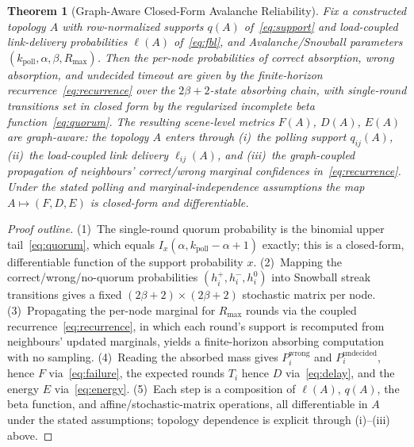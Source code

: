 \documentclass[journal]{IEEEtran}
\newtheorem{theorem}{Theorem}
\newcommand{\kpoll}{\ensuremath{k_{\mathrm{poll}}}}      %
\begin{document}
\begin{theorem}[Graph-Aware Closed-Form Avalanche Reliability]\label{thm:reliability}
Fix a constructed topology $A$ with row-normalized supports $q(A)$
of~\eqref{eq:support} and load-coupled link-delivery probabilities $\ell(A)$
of~\eqref{eq:fbl}, and Avalanche/Snowball parameters
$(\kpoll,\alpha,\beta,R_{\max})$. Then the per-node probabilities of correct
absorption, wrong absorption, and undecided timeout are given by the
finite-horizon recurrence~\eqref{eq:recurrence} over the $2\beta+2$-state
absorbing chain, with single-round transitions set in closed form by the
regularized incomplete beta function~\eqref{eq:quorum}. The resulting
scene-level metrics $F(A)$, $D(A)$, $E(A)$ are \emph{graph-aware}: the topology
$A$ enters through (i)~the polling support $q_{ij}(A)$, (ii)~the load-coupled
link delivery $\ell_{ij}(A)$, and (iii)~the graph-coupled propagation of
neighbours' correct/wrong marginal confidences in~\eqref{eq:recurrence}. Under
the stated polling and marginal-independence assumptions the map
$A\mapsto(F,D,E)$ is closed-form and differentiable.
\end{theorem}

\begin{proof}[Proof outline]
(1)~The single-round quorum probability is the binomial upper
tail~\eqref{eq:quorum}, which equals $I_x(\alpha,\kpoll-\alpha+1)$ exactly; this
is a closed-form, differentiable function of the support probability $x$.
(2)~Mapping the correct/wrong/no-quorum probabilities $(h^+_i,h^-_i,h^0_i)$ into
Snowball streak transitions gives a fixed $(2\beta+2)\times(2\beta+2)$ stochastic
matrix per node. (3)~Propagating the per-node marginal for $R_{\max}$ rounds via
the coupled recurrence~\eqref{eq:recurrence}, in which each round's support is
recomputed from neighbours' updated marginals, yields a finite-horizon absorbing
computation with no sampling. (4)~Reading the absorbed mass gives
$P^{\mathrm{wrong}}_i$ and $P^{\mathrm{undecided}}_i$, hence $F$
via~\eqref{eq:failure}, the expected rounds $T_i$ hence $D$
via~\eqref{eq:delay}, and the energy $E$ via~\eqref{eq:energy}.
(5)~Each step is a composition of $\ell(A)$, $q(A)$, the beta function, and
affine/stochastic-matrix operations, all differentiable in $A$ under the stated
assumptions; topology dependence is explicit through (i)--(iii) above.
\end{proof}
\end{document}
